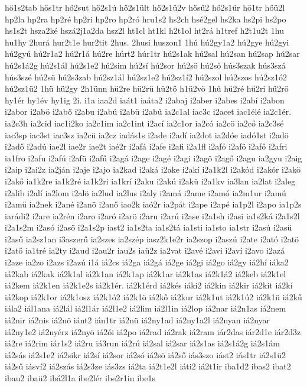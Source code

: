 {hő1s2tab
hős1tr
hő2sut
hő2s1ú
hő2s1ült
hő2s1ü2v
hősű2
hő2s1űr
hő1tr
hőü2l
hp2la
hp2ra
hp2ré
hp2ri
hp2ro
hp2ró
hru1s2
hs2ch
hsé2gel
hs2ka
hs2pi
hs2po
hs1s2t
hsza2ké
hszá2j1a2da
hsz2l
ht1cl
ht1kl
h2t1ol
ht2rá
h1tref
h2t1u2t
1hu
hu1hy
2hurá
hur2t1e
hur2tit
2hus.
2husi
huszon1
1hú
hú2gy1a2
hú2gye
hú2gyi
hú2gyú
hú2r1a2
hú2r1á
hú2re
húrt2
húr1tr
hú2s1ak
hú2sal
hú2san
hú2sap
hú2sar
hú2s1á2g
hú2s1ál
hú2s1e2
hú2sim
hú2sí
hú2sor
hú2sö
hú2ső
hús3szak
hús3szá
hús3szé
hú2sü
hú2s3zab
hú2sz1ál
hú2sz1e2
hú2sz1í2
hú2szol
hú2szos
hú2sz1ó2
hú2sz1ü2
1hü
hü2gy
2h1ünn
hü2re
hü2rü
hü2tő
h1ü2vö
1hű
hű2ré
hű2ri
hű2rö
hy1ér
hy1év
hy1ig
2i.
i1a
iaa2d
iaát1
iaáta2
i2abaj
i2aber
i2abes
i2abí
i2abon
i2abor
i2abö
i2abő
i2abu
i2abú
i2abü
i2abű
ia2c1al
iac3c
i2acet
iac1élé
ia2c1ér.
ia2c3h
ia2cid
iac1i2ko
ia2c1im
ia2c1int
i2ací
ia2c1or
ia2có
ia2cö
ia2cő
ia2c3sé
iac3sp
iac3st
iac3sz
ia2cü
ia2cz
iadás1s
i2ade
i2adí
ia2dot
ia2dóe
iadó1st
i2adö
i2adő
i2adú
iae2l
iae2r
iae2t
iaé2r
i2afá
i2afe
i2afi
i2a1fl
i2afó
i2afö
i2afő
i2afri
ia1fro
i2afu
i2afú
i2afü
i2afű
i2agá
i2age
i2agé
i2agi
i2agö
i2agő
i2agu
ia2gyu
i2aig
i2aip
i2ai2z
ia2ján
i2aje
i2ajo
ia2kad
i2aká
i2ake
i2akí
i2a1k2l
i2akód
i2akór
i2akö
i2akő
ia1k2re
ia1k2ré
ia1k2ri
ia1krí
i2aku
i2akú
i2akü
i2a1kv
ia3lan
ia2lat
i2aleg
i2alib
i2alí
ia2lom
i2alö
ia2lud
ia2lus
i2aly
i2amá
i2ame
i2amó
ia2m1ur
i2amú
i2amű
ia2nek
i2ané
i2anö
i2anő
iao2k
iaó2r
ia2pát
i2ape
i2apé
ia1p2l
i2apo
ia1p2s
iarádi2
i2are
ia2rén
i2aro
i2aró
i2arö
i2aru
i2arú
i2ase
i2a1sh
i2asi
ia1s2ká
i2a1s2l
i2a1s2m
i2asó
i2asö
i2a1s2p
iast2
ia1s2ta
ia1s2tá
ia1sti
ia1sto
ia1str
i2asú
i2asü
i2asű
ia2sz1an
i3aszerű
ia2szes
ia2szép
iasz2k1e2r
ia2szop
i2aszú
i2ate
i2ató
i2atö
i2atő
ia1tré
ia2ty
i2aud
i2au2r
iau2s
iaü2z
ia2vat
i2avé
i2avi
i2aví
i2avo
i2azá
i2aze
ia2zo
i2azs
i2azú
i1á
iá2cs
iá2ga
iá2gá
iá2ge
iá2gi
iá2go
iá2gy
iá2hí
iáka2
iá2kab
iá2kak
iá2k1al
iá2k1an
iá2k1ap
iá2k1ar
iá2k1as
iá2k1á2
iá2keb
iá2k1el
iá2kem
iá2k1en
iá2k1e2s
iá2k1ér.
iá2k1érd
iá2kés
iáki2
iá2kin
iá2kir
iá2kit
iá2kí
iá2kop
iá2k1or
iá2k1osz
iá2k1ó2
iá2k1ö
iá2kő
iá2kur
iá2k1ut
iá2k1ú2
iá2k1ü
iá2kű
iála2
iál1ana
iá2lál
iá2l1ár
iá2l1e2
iá2lim
iá2l1in
iá2lop
iá2nar
iá2n1as
iá2nem
iá2nir
iá2nis
iá2nö
iánt2
ián1tr
iá2nü
iá2ny1ad
iá2ny1a2l
iá2nyan
iá2nyar
iá2ny1e2
iá2nyérz
iá2nyö
iá2ói
iá2po
iá2rad
iá2rak
iá2ram
iár2das
iár2d1e
iár2d3z
iá2re
iá2rim
iár1s2
iá2ru
iá3run
iá2rú
iá2sal
iá2sar
iá2s1as
iá2s1á2g
iá2s1ám
iá2sás
iá2s1e2
iá2sikr
iá2sí
iá2sor
iá2só
iá2sö
iá2ső
iás3szo
iást2
iás1tr
iá2s1ü2
iá2sű
iásví2
iá2szás
iá2s3ze
iás3zs
iá2ta
iá2t1e2l
iáti2
iá2t1ir
iba1d2
ibas2
ibat2
ibau2
ibaü2
ibá2l1a
ibe2lér
ibe2r1in
ibe1s
}
